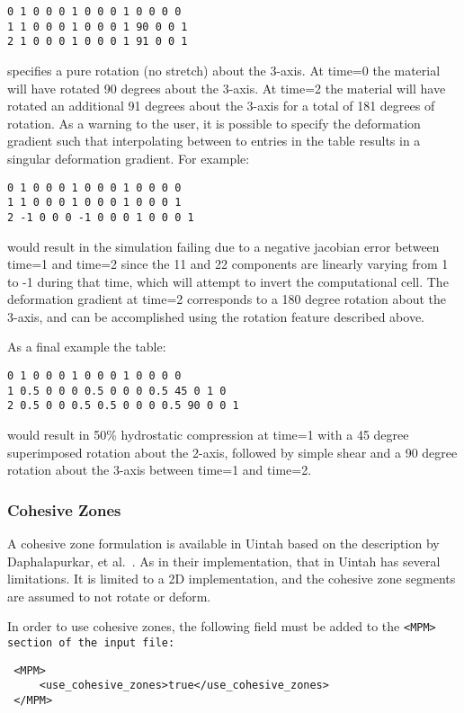 \begin{Verbatim}
0 1 0 0 0 1 0 0 0 1 0 0 0 0
1 1 0 0 0 1 0 0 0 1 90 0 0 1
2 1 0 0 0 1 0 0 0 1 91 0 0 1
\end{Verbatim}
specifies a pure rotation (no stretch) about the 3-axis.  At time=0 the material will have rotated 90 degrees about the 3-axis.  At time=2 the material will have rotated an additional 91 degrees about the 3-axis for a total of 181 degrees of rotation.  As a warning to the user, it is possible to specify the deformation gradient such that interpolating between to entries in the table results in a singular deformation gradient.  For example:
\begin{Verbatim}
0 1 0 0 0 1 0 0 0 1 0 0 0 0
1 1 0 0 0 1 0 0 0 1 0 0 0 1
2 -1 0 0 0 -1 0 0 0 1 0 0 0 1
\end{Verbatim}
would result in the simulation failing due to a negative jacobian error between time=1 and time=2 since the 11 and 22 components are linearly varying from 1 to -1 during that time, which will attempt to invert the computational cell.  The deformation gradient at time=2 corresponds to a 180 degree rotation about the 3-axis, and can be accomplished using the rotation feature described above.

As a final example the table:
\begin{Verbatim}
0 1 0 0 0 1 0 0 0 1 0 0 0 0
1 0.5 0 0 0 0.5 0 0 0 0.5 45 0 1 0
2 0.5 0 0 0.5 0.5 0 0 0 0.5 90 0 0 1
\end{Verbatim}
would result in 50\% hydrostatic compression at time=1 with a 45 degree superimposed rotation about the 2-axis, followed by  simple shear and a 90 degree rotation about the 3-axis between time=1 and time=2.


\subsubsection{Cohesive Zones} \label{CohesiveZones}
A cohesive zone formulation is available in Uintah based on the description
by Daphalapurkar, et al.~\cite{Daphalapurkar}.  As in their implementation,
that in Uintah has several limitations.  It is limited to a 2D implementation,
and the cohesive zone segments are assumed to not rotate or deform.

In order to use cohesive zones, the following field must be added to the
\tt <MPM> \normalfont section of the input file:

\begin{Verbatim}
 <MPM>
     <use_cohesive_zones>true</use_cohesive_zones>
 </MPM>
\end{Verbatim}

